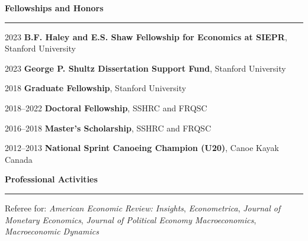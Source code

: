 \documentclass[12pt]{article}
\begin{document}
{\large \textbf{Fellowships and Honors}} \\
\noindent\rule[0.5\baselineskip]{\textwidth}{1pt}

\begin{small}

2023 \tabto{3cm} \textbf{B.F. Haley and E.S. Shaw Fellowship for Economics at SIEPR}, Stanford University

2023 \tabto{3cm} \textbf{George P. Shultz Dissertation Support Fund}, Stanford University

2018 \tabto{3cm} \textbf{Graduate Fellowship}, Stanford University

2018--2022 \tabto{3cm} \textbf{Doctoral Fellowship}, SSHRC and FRQSC

2016--2018 \tabto{3cm} \textbf{Master's Scholarship}, SSHRC and FRQSC

2012--2013 \tabto{3cm} \textbf{National Sprint Canoeing Champion (U20)}, Canoe Kayak Canada
\end{small}

\vspace{0.5cm}

{\large \textbf{Professional Activities}} \\
\noindent\rule[0.5\baselineskip]{\textwidth}{1pt}

{\small Referee for: \textit{American Economic Review: Insights}, \textit{Econometrica}, \textit{Journal of Monetary Economics}, \textit{Journal of Political Economy Macroeconomics}, \textit{Macroeconomic Dynamics}}
\end{document}
